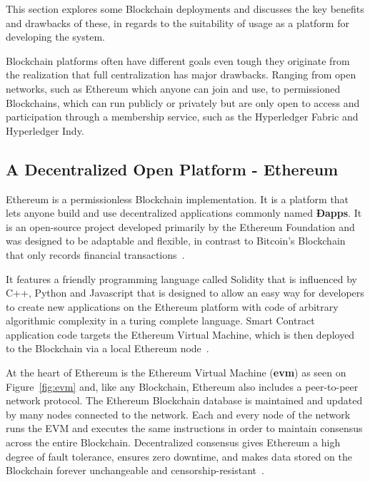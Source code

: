 This section  explores some Blockchain deployments and discusses the key benefits and drawbacks of these, in regards to the suitability of usage as a platform
for developing the system.

Blockchain platforms often have different goals even tough they originate from
the realization that full centralization has major drawbacks. Ranging from open
networks, such as Ethereum which anyone can join and use, to permissioned
Blockchains, which can run publicly or privately but are only open to access
and participation through a membership service, such as the Hyperledger Fabric
and Hyperledger Indy.

\subsection{A Decentralized Open Platform - Ethereum}

Ethereum is a permissionless Blockchain implementation. It is a platform that lets anyone build and use decentralized applications commonly named \textbf{Ðapps}. It is an open-source project developed primarily by the Ethereum Foundation and was designed to be adaptable and flexible, in contrast to Bitcoin's Blockchain that only records financial transactions~\cite{EthereumDocs2018}.

 It features a friendly programming language called Solidity that is influenced by C++, Python and Javascript that is designed to allow an easy way for developers to create new applications on the Ethereum platform with code of arbitrary algorithmic complexity in a turing complete language. Smart Contract application code targets the Ethereum Virtual Machine, which is then
deployed to the Blockchain via a local Ethereum node~\cite{Wood2017,Barclay2017}.

At the heart of Ethereum is the Ethereum Virtual Machine (\textbf{evm}) as seen on Figure~\ref{fig:evm} and, like any Blockchain, Ethereum also includes a peer-to-peer network protocol. The Ethereum Blockchain database is maintained and updated by many nodes connected to the network. Each and every node of the network runs the EVM and executes the same instructions in order to maintain consensus across the entire Blockchain. Decentralized consensus gives Ethereum a high degree of fault tolerance, ensures zero downtime, and makes data stored on the Blockchain forever unchangeable and censorship-resistant~\cite{EthereumDocs2018}.

